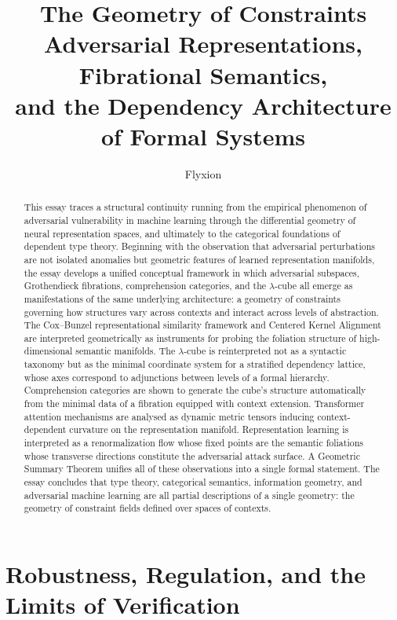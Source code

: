 \documentclass[12pt,a4paper]{article}
\title{\textbf{The Geometry of Constraints}\\[0.6em]
\large Adversarial Representations, Fibrational Semantics,\\
and the Dependency Architecture of Formal Systems}
\author{Flyxion}
\date{}
\theoremstyle{plain}
\theoremstyle{definition}
\begin{document}
\maketitle
\thispagestyle{empty}

\begin{abstract}
This essay traces a structural continuity running from the empirical
phenomenon of adversarial vulnerability in machine learning through the
differential geometry of neural representation spaces, and ultimately to
the categorical foundations of dependent type theory. Beginning with the
observation that adversarial perturbations are not isolated anomalies but
geometric features of learned representation manifolds, the essay develops
a unified conceptual framework in which adversarial subspaces, Grothendieck
fibrations, comprehension categories, and the $\lambda$-cube all emerge as
manifestations of the same underlying architecture: a geometry of constraints
governing how structures vary across contexts and interact across levels of
abstraction. The Cox--Bunzel representational similarity framework and
Centered Kernel Alignment are interpreted geometrically as instruments for
probing the foliation structure of high-dimensional semantic manifolds. The
$\lambda$-cube is reinterpreted not as a syntactic taxonomy but as the minimal
coordinate system for a stratified dependency lattice, whose axes correspond to
adjunctions between levels of a formal hierarchy. Comprehension categories are
shown to generate the cube's structure automatically from the minimal data of a
fibration equipped with context extension. Transformer attention mechanisms are
analysed as dynamic metric tensors inducing context-dependent curvature on the
representation manifold. Representation learning is interpreted as a
renormalization flow whose fixed points are the semantic foliations whose
transverse directions constitute the adversarial attack surface. A Geometric
Summary Theorem unifies all of these observations into a single formal
statement. The essay concludes that type theory, categorical semantics,
information geometry, and adversarial machine learning are all partial
descriptions of a single geometry: the geometry of constraint fields defined
over spaces of contexts.
\end{abstract}

\newpage
\tableofcontents
\newpage

\section{Robustness, Regulation, and the Limits of Verification}
\end{document}
